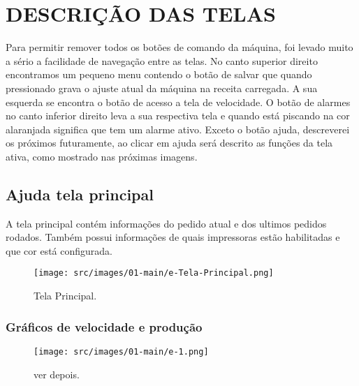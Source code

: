 \thispagestyle{fancy}

\vspace*{\fill}

\section{\MakeUppercase{\large{Descrição das telas}}}

Para permitir remover todos os botões de comando da máquina, foi levado muito a sério a facilidade de navegação entre as telas.
No canto superior direito encontramos um pequeno menu contendo o botão de salvar que quando pressionado grava o ajuste atual da máquina na receita carregada. A sua esquerda se encontra o botão de acesso a tela de velocidade. O botão de alarmes no canto inferior direito leva a sua respectiva tela e quando está piscando na cor alaranjada significa que tem um alarme ativo. Exceto o botão ajuda, descreverei os próximos futuramente, ao clicar em ajuda será descrito as funções da tela ativa, como mostrado nas próximas imagens.

\subsection{Ajuda tela principal}

A tela principal contém informações do pedido atual e dos ultimos pedidos rodados. Também
possui informações de quais impressoras estão habilitadas e que cor está configurada.

\begin{figure}[h]
  \centering
  \texttt{[image: src/images/01-main/e-Tela-Principal.png]}
  \caption{Tela Principal.}
   \label{}
\end{figure}

\newpage
\thispagestyle{fancy}

\vspace*{\fill}

\subsubsection{\small{Gráficos de velocidade e produção}}


\begin{figure}[h]
  \centering
  \texttt{[image: src/images/01-main/e-1.png]}
  \caption{ver depois.}
   \label{}
\end{figure}

\vspace*{\fill}

